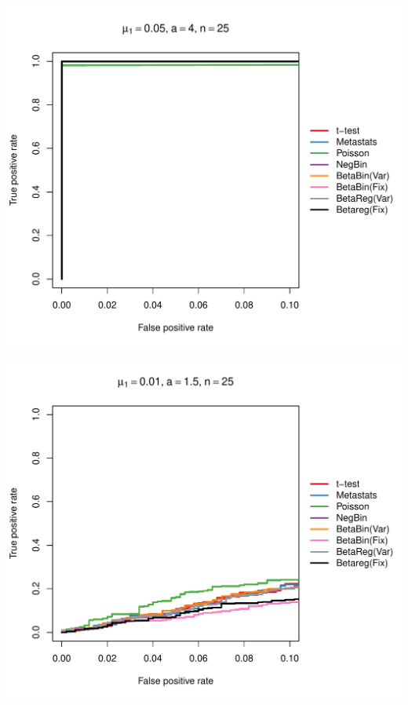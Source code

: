 \documentclass[12pt]{article}\usepackage{graphicx, color}
\makeatletter
\def\maxwidth{ %
  \ifdim\Gin@nat@width>\linewidth
    \linewidth
  \else
    \Gin@nat@width
  \fi
}
\newenvironment{knitrout}{}{} %
\makeatother
\begin{document}
\begin{knitrout}
{\centering \includegraphics[width=\maxwidth]{figure/rocs33} 

}




{\centering \includegraphics[width=\maxwidth]{figure/rocs34} 

}





\end{knitrout}
\end{document}
